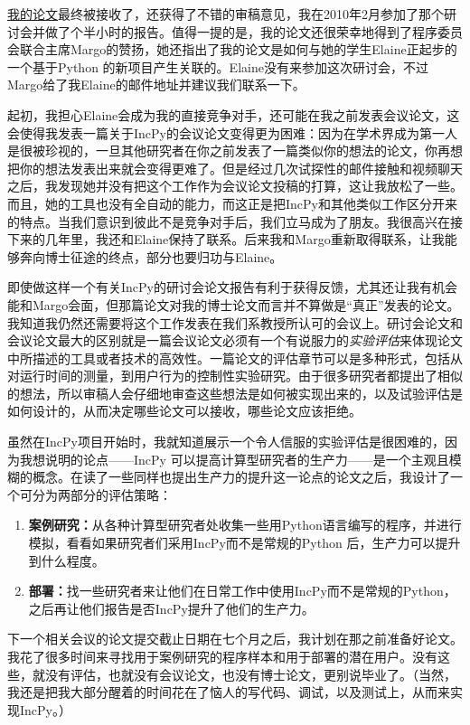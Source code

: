 \documentclass[12pt,UTF8,nofonts]{book}
\begin{document}
\href{http://www.pgbovine.net/projects/pubs/guo_tapp10_camera_ready.pdf}{我的论文}最终被接收了，还获得了不错的审稿意见，我在2010年2月参加了那个研讨会并做了个半小时的报告。值得一提的是，我的论文还很荣幸地得到了程序委员会联合主席Margo的赞扬，她还指出了我的论文是如何与她的学生Elaine正起步的一个基于Python 的新项目产生关联的。Elaine没有来参加这次研讨会，不过Margo给了我Elaine的邮件地址并建议我们联系一下。

起初，我担心Elaine会成为我的直接竞争对手，还可能在我之前发表会议论文，这会使得我发表一篇关于IncPy的会议论文变得更为困难：因为在学术界成为第一人是很被珍视的，一旦其他研究者在你之前发表了一篇类似你的想法的论文，你再想把你的想法发表出来就会变得更难了。但是经过几次试探性的邮件接触和视频聊天之后，我发现她并没有把这个工作作为会议论文投稿的打算，这让我放松了一些。而且，她的工具也没有全自动的能力，而这正是把IncPy和其他类似工作区分开来的特点。当我们意识到彼此不是竞争对手后，我们立马成为了朋友。我很高兴在接下来的几年里，我还和Elaine保持了联系。后来我和Margo重新取得联系，让我能够奔向博士征途的终点，部分也要归功与Elaine。

\breakline

即使做这样一个有关IncPy的研讨会论文报告有利于获得反馈，尤其还让我有机会能和Margo会面，但那篇论文对我的博士论文而言并不算做是“真正”发表的论文。我知道我仍然还需要将这个工作发表在我们系教授所认可的会议上。研讨会论文和会议论文最大的区别就是一篇会议论文必须有一个有说服力的\emph{实验评估}来体现论文中所描述的工具或者技术的高效性。一篇论文的评估章节可以是多种形式，包括从对运行时间的测量，到用户行为的控制性实验研究。由于很多研究者都提出了相似的想法，所以审稿人会仔细地审查这些想法是如何被实现出来的，以及试验评估是如何设计的，从而决定哪些论文可以接收，哪些论文应该拒绝。

虽然在IncPy项目开始时，我就知道展示一个令人信服的实验评估是很困难的，因为我想说明的论点——IncPy 可以提高计算型研究者的生产力——是一个主观且模糊的概念。在读了一些同样也提出生产力的提升这一论点的论文之后，我设计了一个可分为两部分的评估策略：
\begin{enumerate}
  \item \textbf{案例研究：}从各种计算型研究者处收集一些用Python语言编写的程序，并进行模拟，看看如果研究者们采用IncPy而不是常规的Python 后，生产力可以提升到什么程度。
  \item \textbf{部署：}找一些研究者来让他们在日常工作中使用IncPy而不是常规的Python，之后再让他们报告是否IncPy提升了他们的生产力。
\end{enumerate}
下一个相关会议的论文提交截止日期在七个月之后，我计划在那之前准备好论文。我花了很多时间来寻找用于案例研究的程序样本和用于部署的潜在用户。没有这些，就没有评估，也就没有会议论文，也没有博士论文，更别说毕业了。（当然，我还是把我大部分醒着的时间花在了恼人的写代码、调试，以及测试上，从而来实现IncPy。）
\end{document}
